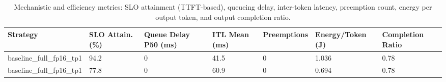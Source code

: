 \begin{table}
\caption{Mechanistic and efficiency metrics: SLO attainment (TTFT-based), queueing delay, inter-token latency, preemption count, energy per output token, and output completion ratio.}
\label{tab:efficiency}
\begin{tabular}{lllllll}
\toprule
Strategy & SLO Attain. (\%) & Queue Delay P50 (ms) & ITL Mean (ms) & Preemptions & Energy/Token (J) & Completion Ratio \\
\midrule
baseline\_full\_fp16\_tp1 & 94.2 & 0 & 41.5 & 0 & 1.036 & 0.78 \\
baseline\_full\_fp16\_tp1 & 77.8 & 0 & 60.9 & 0 & 0.694 & 0.78 \\
\bottomrule
\end{tabular}
\end{table}
